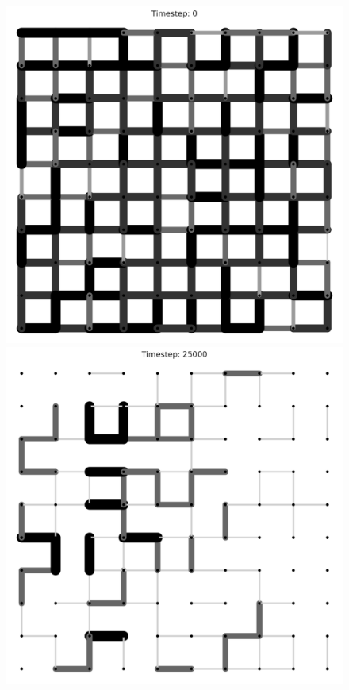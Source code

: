 \begin{figure}[htbp]
    \centering
    \begin{minipage}[t]{0.24\linewidth}
        \centering
        \includegraphics[width=\linewidth]{images/ax0.png}
        
    \end{minipage}
    \hfill
    \begin{minipage}[t]{0.24\linewidth}
        \centering
        \includegraphics[width=\linewidth]{images/ax1.png}
        

\end{minipage}
\end{figure}
